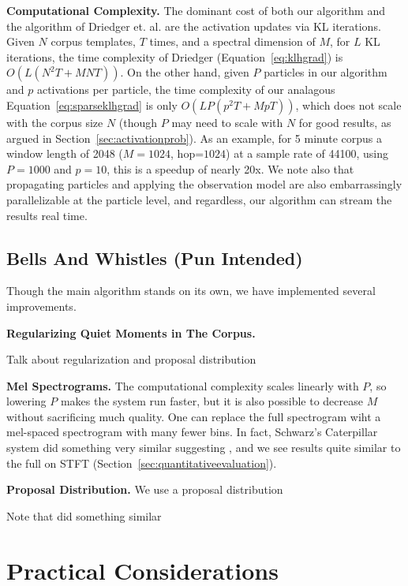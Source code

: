 \documentclass{article}
\begin{document}
\textbf{Computational Complexity.} The dominant cost of both our algorithm and the algorithm of Driedger et. al. are the activation updates via KL iterations.  Given $N$ corpus templates, $T$ times, and a spectral dimension of $M$, for $L$ KL iterations, the time complexity of Driedger (Equation~\ref{eq:klhgrad}) is $O(L(N^2T + MNT))$.  On the other hand, given $P$ particles in our algorithm and $p$ activations per particle, the time complexity of our analagous Equation~\ref{eq:sparseklhgrad} is only $O(LP(p^2T + MpT))$, which does not scale with the corpus size $N$ (though $P$ may need to scale with $N$ for good results, as argued in Section~\ref{sec:activationprob}).  As an example, for 5 minute corpus a window length of 2048 ($M=1024$, hop=$1024$) at a sample rate of 44100, using $P=1000$ and $p=10$, this is a speedup of nearly 20x.  We note also that propagating particles and applying the observation model are also embarrassingly parallelizable at the particle level, and regardless, our algorithm can stream the results real time.


\subsection{Bells And Whistles (Pun Intended)}

Though the main algorithm stands on its own, we have implemented several improvements.



\textbf{Regularizing Quiet Moments in The Corpus.}

Talk about regularization and proposal distribution


\textbf{Mel Spectrograms.} The computational complexity scales linearly with $P$, so lowering $P$ makes the system run faster, but it is also possible to decrease $M$ without sacrificing much quality.  One can replace the full spectrogram wiht a mel-spaced spectrogram with many fewer bins.  In fact, Schwarz's Caterpillar system did something very similar suggesting \cite{schwarz2000system}, and we see results quite similar to the full on STFT (Section~\ref{sec:quantitativeevaluation}).


\textbf{Proposal Distribution.} We use a proposal distribution

Note that \cite{buch2017nichtnegativematrixfaktorisierungnutzendesklangsynthesensystem} did something similar




\section{Practical Considerations}
\end{document}
